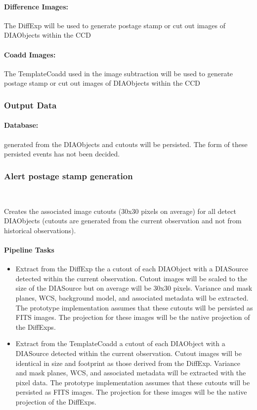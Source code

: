 \paragraph{Difference Images:} The DiffExp will be used to  generate postage stamp or cut out images of DIAObjects within the CCD 

\paragraph{Coadd Images:} The TemplateCoadd used in the image subtraction will be used to  generate postage stamp or cut out images of DIAObjects   within the CCD


\subsubsection{Output Data}

\paragraph{\VOEvent Database:} \VOEvents generated from the DIAObjects and cutouts will be persisted. The form of these persisted events has not been decided.



\subsubsection{Alert postage stamp generation}~

Creates the associated image cutouts (30x30 pixels on average) for all detect DIAObjects (cutouts are generated from the current observation and not from historical observations).

\paragraph{Pipeline Tasks}
 \begin{itemize}
\item Extract from the DiffExp the a cutout of each DIAObject with a DIASource detected within the current observation.  Cutout images will be scaled to the size of the DIASource but on average will be 30x30 pixels. Variance and mask planes, WCS, background model, and associated metadata will be extracted. The prototype implementation assumes that these cutouts will be persisted as FITS images. The projection for these images will be the native projection of the DiffExps.

\item Extract from the TemplateCoadd  a cutout of each DIAObject with a DIASource detected within the current observation.  Cutout images will be identical in size and footprint as those derived from the DiffExp. Variance and mask planes, WCS, and associated metadata will be extracted with the pixel data. The prototype implementation assumes that these cutouts will be persisted as FITS images. The projection for these images will be the native projection of the DiffExps.
\end{itemize}

